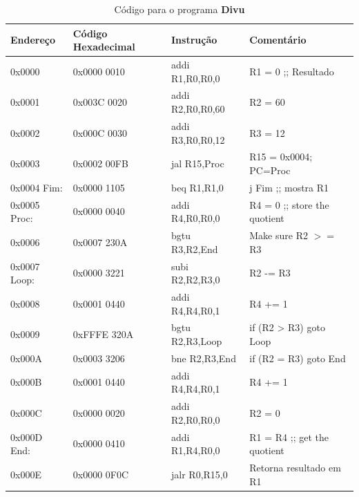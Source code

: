 \documentclass[12pt]{article}
\begin{document}
\begin{table}[H]
    \centering
    \caption{Código para o programa \textbf{Divu}}
    \begin{tabular}{|l|l|l|l|}\hline
        \textbf{Endereço} & \textbf{Código Hexadecimal} & \textbf{Instrução} & \textbf{Comentário} \\\hline
        0x0000       & 0x0000 0010 & addi R1,R0,R0,0  & R1 = 0 ;; Resultado           \\\hline
        0x0001       & 0x003C 0020 & addi R2,R0,R0,60 & R2 = 60                       \\\hline
        0x0002       & 0x000C 0030 & addi R3,R0,R0,12 & R3 = 12                       \\\hline
        0x0003       & 0x0002 00FB & jal R15,Proc     & R15 = 0x0004; PC=Proc         \\\hline
        0x0004 Fim:  & 0x0000 1105 & beq R1,R1,0      & j Fim ;; mostra R1            \\\hline
        0x0005 Proc: & 0x0000 0040 & addi R4,R0,R0,0  & R4 = 0 ;; store the quotient  \\\hline
        0x0006       & 0x0007 230A & bgtu R3,R2,End   & Make sure R2 $>=$ R3           \\\hline
        0x0007 Loop: & 0x0000 3221 & subi R2,R2,R3,0  & R2 -= R3                      \\\hline
        0x0008       & 0x0001 0440 & addi R4,R4,R0,1  & R4 += 1                       \\\hline
        0x0009       & 0xFFFE 320A & bgtu R2,R3,Loop  & if (R2 > R3) goto Loop        \\\hline
        0x000A       & 0x0003 3206 & bne  R2,R3,End   & if (R2 \!= R3) goto End       \\\hline
        0x000B       & 0x0001 0440 & addi R4,R4,R0,1  & R4 += 1                       \\\hline
        0x000C       & 0x0000 0020 & addi R2,R0,R0,0  & R2 = 0                        \\\hline
        0x000D End:  & 0x0000 0410 & addi R1,R4,R0,0  & R1 = R4 ;; get the quotient   \\\hline
        0x000E       & 0x0000 0F0C & jalr R0,R15,0    & Retorna resultado em R1       \\\hline
    \end{tabular}\label{tab:programs:divu}
\end{table}

\end{document}
